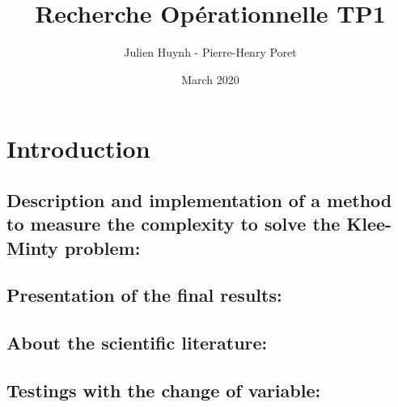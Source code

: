 \documentclass{article}
\title{Recherche Opérationnelle TP1}
\author{Julien Huynh - Pierre-Henry Poret }
\date{March 2020}
\begin{document}
\maketitle

\section{Introduction}

\subsection{Description and implementation of a method to measure the complexity to solve the Klee-Minty problem:}

\subsection{Presentation of the final results:}

\subsection{About the scientific literature:}

\subsection{Testings with the change of variable:}
\end{document}
